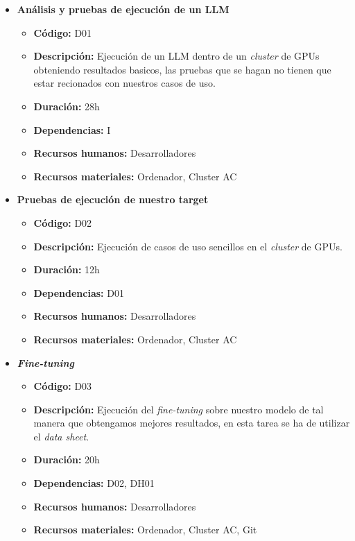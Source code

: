 \begin{itemize}
    \item \textbf{Análisis y pruebas de ejecución de un LLM}
        \begin{itemize}
            \item \textbf{Código:} D01
            \item \textbf{Descripción:} Ejecución de un LLM dentro de un \textit{cluster} de GPUs obteniendo resultados basicos, las pruebas que se hagan
                no tienen que estar recionados con nuestros casos de uso.
            \item \textbf{Duración:} 28h
            \item \textbf{Dependencias:} I
            \item \textbf{Recursos humanos:} Desarrolladores
            \item \textbf{Recursos materiales:} Ordenador, Cluster AC
        \end{itemize}
    \item \textbf{Pruebas de ejecución de nuestro target}
        \begin{itemize}
            \item \textbf{Código:} D02
            \item \textbf{Descripción:} Ejecución de casos de uso sencillos en el \textit{cluster} de GPUs.
            \item \textbf{Duración:} 12h
            \item \textbf{Dependencias:} D01
            \item \textbf{Recursos humanos:} Desarrolladores
            \item \textbf{Recursos materiales:} Ordenador, Cluster AC
        \end{itemize}
    \item \textbf{\textit{Fine-tuning}}
        \begin{itemize}
            \item \textbf{Código:} D03
            \item \textbf{Descripción:} Ejecución del \textit{fine-tuning} sobre nuestro modelo de tal manera que obtengamos mejores resultados,
                en esta tarea se ha de utilizar el \textit{data sheet}.
            \item \textbf{Duración:} 20h
            \item \textbf{Dependencias:} D02, DH01
            \item \textbf{Recursos humanos:} Desarrolladores
            \item \textbf{Recursos materiales:} Ordenador, Cluster AC, Git

\end{itemize}
\end{itemize}
